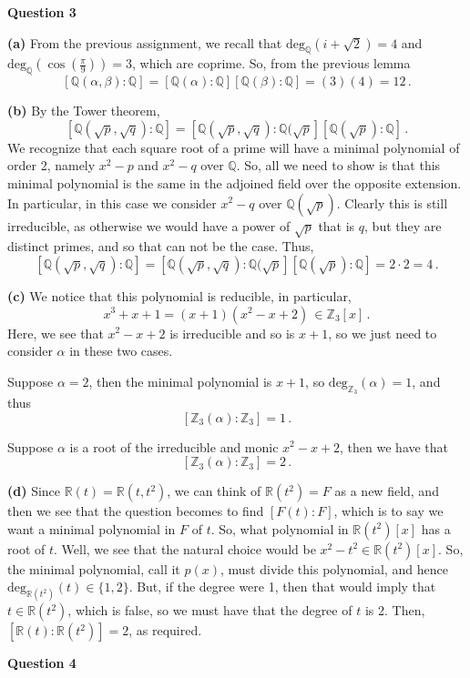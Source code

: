 \documentclass[10pt]{article}
\newcommand{\Z}{\mathbb{Z}}
\newcommand{\R}{\mathbb{R}}
\newcommand{\Q}{\mathbb{Q}}
\begin{document}
\newpage
\textbf{Question 3}

\textbf{(a)} From the previous assignment, we recall that $\text{deg}_{\Q}(i + \sqrt{2}) = 4$ and $\text{deg}_{\Q}(\cos(\frac{\pi}{9})) = 3$, which are coprime. So, from the previous lemma
\[ [\Q(\alpha,\beta): \Q] = [\Q(\alpha):\Q][\Q(\beta):\Q] = (3)(4) = 12 \, .\]

\textbf{(b)} By the Tower theorem,
\[ [\Q(\sqrt{p},\sqrt{q}):\Q] = [\Q(\sqrt{p},\sqrt{q}):\Q(\sqrt{p}][\Q(\sqrt{p}):\Q] \,.\]
We recognize that each square root of a prime will have a minimal polynomial of order 2, namely $x^{2} - p$ and $x^{2} - q$ over $\Q$. So, all we need to show is that this minimal polynomial is the same in the adjoined field over the opposite extension. In particular, in this case we consider $x^{2} - q$ over $\Q(\sqrt{p})$. Clearly this is still irreducible, as otherwise we would have a power of $\sqrt{p}$ that is $q$, but they are distinct primes, and so that can not be the case. Thus,
\[ [\Q(\sqrt{p},\sqrt{q}):\Q] = [\Q(\sqrt{p},\sqrt{q}):\Q(\sqrt{p}][\Q(\sqrt{p}):\Q] = 2\cdot 2 = 4 \,.\]

\textbf{(c)} We notice that this polynomial is reducible, in particular,
\[ x^{3} + x + 1 = (x + 1)(x^{2} - x + 2) \, \in \Z_{3}[x] \, .\]
Here, we see that $x^{2} - x + 2$ is irreducible and so is $x + 1$, so we just need to consider $\alpha$ in these two cases.

Suppose $\alpha = 2$, then the minimal polynomial is $x + 1$, so $\text{deg}_{\Z_{3}}(\alpha) = 1$, and thus
\[[\Z_{3}(\alpha):\Z_{3}] = 1 \, .\]

Suppose $\alpha$ is a root of the irreducible and monic $x^{2} - x + 2$, then we have that
\[[\Z_{3}(\alpha):\Z_{3}] = 2 \, .\]

\textbf{(d)} Since $\R(t) = \R(t,t^{2})$, we can think of $\R(t^{2}) = F$ as a new field, and then we see that the question becomes to find $[F(t):F]$, which is to say we want a minimal polynomial in $F$ of $t$. So, what polynomial in $\R(t^{2})[x]$ has a root of $t$. Well, we see that the natural choice would be $x^{2} - t^{2} \in \R(t^{2})[x]$. So, the minimal polynomial, call it $p(x)$, must divide this polynomial, and hence $\text{deg}_{\R(t^{2})}(t) \in \{1,2\}$. But, if the degree were 1, then that would imply that $t\in \R(t^{2})$, which is false, so we must have that the degree of $t$ is 2. Then, $[\R(t):\R(t^{2})] = 2$, as required.

\newpage
\textbf{Question 4}
\end{document}
